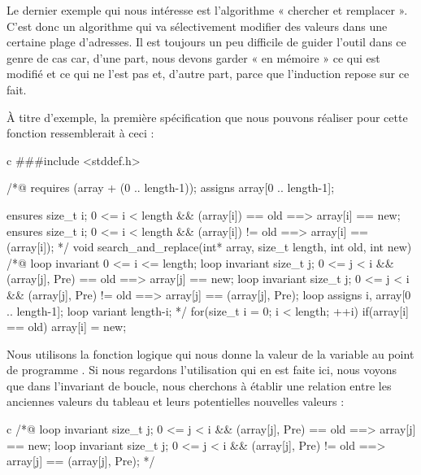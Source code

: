 \documentclass[middle]{zmdocument}
\begin{document}
Le dernier exemple qui nous intéresse est l'algorithme « chercher et remplacer ». 
C'est donc un algorithme qui va sélectivement modifier des valeurs dans une 
certaine plage d'adresses. Il est toujours un peu difficile de guider l'outil 
dans ce genre de cas car, d'une part, nous devons garder « en mémoire » ce qui est modifié 
et ce qui ne l'est pas et, d'autre part, parce que l'induction repose sur ce fait.



À titre d'exemple, la première spécification que nous pouvons réaliser pour 
cette fonction ressemblerait à ceci :



\begin{CodeBlock}{c}
###include <stddef.h>

/*@
  requires \valid(array + (0 .. length-1));
  assigns array[0 .. length-1];

  ensures \forall size_t i; 0 <= i < length && \old(array[i]) == old
             ==> array[i] == new;
  ensures \forall size_t i; 0 <= i < length && \old(array[i]) != old 
             ==> array[i] == \old(array[i]);
*/
void search_and_replace(int* array, size_t length, int old, int new){
  /*@
    loop invariant 0 <= i <= length;
    loop invariant \forall size_t j; 0 <= j < i && \at(array[j], Pre) == old 
                     ==> array[j] == new;
    loop invariant \forall size_t j; 0 <= j < i && \at(array[j], Pre) != old 
                     ==> array[j] == \at(array[j], Pre);
    loop assigns i, array[0 .. length-1];
    loop variant length-i;
  */
  for(size_t i = 0; i < length; ++i){
    if(array[i] == old) array[i] = new;
  }
}
\end{CodeBlock}



Nous utilisons la fonction logique  qui nous donne la valeur de
la variable  au point de programme . Si nous regardons l'utilisation qui
en est faite ici, nous voyons que dans l'invariant de boucle, nous cherchons à 
établir une relation entre les anciennes valeurs du tableau et leurs potentielles 
nouvelles valeurs :



\begin{CodeBlock}{c}
/*@
  loop invariant \forall size_t j; 0 <= j < i && \at(array[j], Pre) == old 
                   ==> array[j] == new;
  loop invariant \forall size_t j; 0 <= j < i && \at(array[j], Pre) != old 
                   ==> array[j] == \at(array[j], Pre);
*/
\end{CodeBlock}
\end{document}
